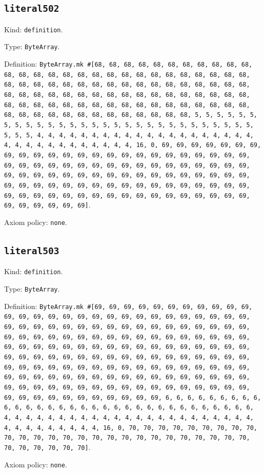 \documentclass[11pt]{article}
\begin{document}
\subsection*{\texttt{literal502}}
\noindent Kind: \texttt{definition}.\par
\noindent Type: \texttt{ByteArray}.\par
\noindent Definition: \texttt{ByteArray.mk \#[68, 68, 68, 68, 68, 68, 68, 68, 68, 68, 68, 68, 68, 68, 68, 68, 68, 68, 68, 68, 68, 68, 68, 68, 68, 68, 68, 68, 68, 68, 68, 68, 68, 68, 68, 68, 68, 68, 68, 68, 68, 68, 68, 68, 68, 68, 68, 68, 68, 68, 68, 68, 68, 68, 68, 68, 68, 68, 68, 68, 68, 68, 68, 68, 68, 68, 68, 68, 68, 68, 68, 68, 68, 68, 68, 68, 68, 68, 68, 68, 68, 68, 68, 68, 68, 68, 68, 68, 68, 68, 68, 68, 5, 5, 5, 5, 5, 5, 5, 5, 5, 5, 5, 5, 5, 5, 5, 5, 5, 5, 5, 5, 5, 5, 5, 5, 5, 5, 5, 5, 5, 5, 5, 5, 4, 4, 4, 4, 4, 4, 4, 4, 4, 4, 4, 4, 4, 4, 4, 4, 4, 4, 4, 4, 4, 4, 4, 4, 4, 4, 4, 4, 4, 4, 4, 4, 16, 0, 69, 69, 69, 69, 69, 69, 69, 69, 69, 69, 69, 69, 69, 69, 69, 69, 69, 69, 69, 69, 69, 69, 69, 69, 69, 69, 69, 69, 69, 69, 69, 69, 69, 69, 69, 69, 69, 69, 69, 69, 69, 69, 69, 69, 69, 69, 69, 69, 69, 69, 69, 69, 69, 69, 69, 69, 69, 69, 69, 69, 69, 69, 69, 69, 69, 69, 69, 69, 69, 69, 69, 69, 69, 69, 69, 69, 69, 69, 69, 69, 69, 69, 69, 69, 69, 69, 69, 69, 69, 69, 69, 69, 69, 69, 69, 69, 69, 69]}.\par
\noindent Axiom policy: \texttt{none}.\par
\subsection*{\texttt{literal503}}
\noindent Kind: \texttt{definition}.\par
\noindent Type: \texttt{ByteArray}.\par
\noindent Definition: \texttt{ByteArray.mk \#[69, 69, 69, 69, 69, 69, 69, 69, 69, 69, 69, 69, 69, 69, 69, 69, 69, 69, 69, 69, 69, 69, 69, 69, 69, 69, 69, 69, 69, 69, 69, 69, 69, 69, 69, 69, 69, 69, 69, 69, 69, 69, 69, 69, 69, 69, 69, 69, 69, 69, 69, 69, 69, 69, 69, 69, 69, 69, 69, 69, 69, 69, 69, 69, 69, 69, 69, 69, 69, 69, 69, 69, 69, 69, 69, 69, 69, 69, 69, 69, 69, 69, 69, 69, 69, 69, 69, 69, 69, 69, 69, 69, 69, 69, 69, 69, 69, 69, 69, 69, 69, 69, 69, 69, 69, 69, 69, 69, 69, 69, 69, 69, 69, 69, 69, 69, 69, 69, 69, 69, 69, 69, 69, 69, 69, 69, 69, 69, 69, 69, 69, 69, 69, 69, 69, 69, 69, 69, 69, 69, 69, 69, 69, 69, 69, 69, 69, 69, 69, 69, 69, 69, 69, 69, 69, 69, 69, 69, 6, 6, 6, 6, 6, 6, 6, 6, 6, 6, 6, 6, 6, 6, 6, 6, 6, 6, 6, 6, 6, 6, 6, 6, 6, 6, 6, 6, 6, 6, 6, 6, 4, 4, 4, 4, 4, 4, 4, 4, 4, 4, 4, 4, 4, 4, 4, 4, 4, 4, 4, 4, 4, 4, 4, 4, 4, 4, 4, 4, 4, 4, 4, 4, 16, 0, 70, 70, 70, 70, 70, 70, 70, 70, 70, 70, 70, 70, 70, 70, 70, 70, 70, 70, 70, 70, 70, 70, 70, 70, 70, 70, 70, 70, 70, 70, 70, 70]}.\par
\noindent Axiom policy: \texttt{none}.\par
\end{document}

